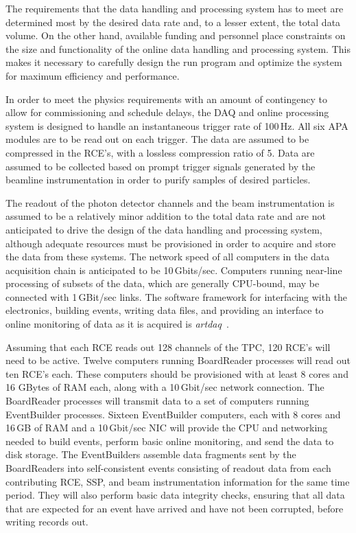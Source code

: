 The requirements that the data handling and processing system has to meet are
determined most  by the desired data rate and, to a lesser extent, the total data volume.
On the other hand, available funding and personnel place
constraints on the size and functionality of the online data handling
and processing system. This makes it necessary to carefully design
the run program and optimize the system for maximum efficiency and
performance.

In order to meet the physics requirements with an amount of
contingency to allow for commissioning and schedule delays, the DAQ
and online processing system is designed to handle an instantaneous
trigger rate of 100\,Hz.  All six APA modules are to be read out on
each trigger.  The data are assumed to be compressed in the RCE's,
with a lossless compression ratio of 5.  Data are assumed to be
collected based on prompt trigger signals generated by the beamline
instrumentation in order to purify samples of desired particles.

The readout of the photon detector channels and the beam
instrumentation is assumed to be a relatively minor addition to the
total data rate and are not anticipated to drive the design of the
data handling and processing system, although adequate resources must
be provisioned in order to acquire and store the data from these
systems.  The network speed of all computers in the data acquisition
chain is anticipated to be 10\,Gbits/sec.  Computers running near-line
processing of subsets of the data, which are generally CPU-bound, may
be connected with 1\,GBit/sec links.  The software framework for
interfacing with the electronics, building events, writing data files,
and providing an interface to online monitoring of data as it is
acquired is {\it artdaq}~\cite{artdaq}.

Assuming that each RCE reads out 128 channels of the TPC, 120 RCE's
will need to be active.  Twelve computers running BoardReader
processes will read out ten RCE's each.  These computers should be
provisioned with at least 8 cores and 16 GBytes of RAM each, along
with a 10\,Gbit/sec network connection.  The BoardReader processes will
transmit data to a set of computers running EventBuilder processes.
Sixteen EventBuilder computers, each with 8 cores and 16\,GB of RAM
and a 10\,Gbit/sec NIC will provide the CPU and networking needed to
build events, perform basic online monitoring, and send the data to
disk storage.  The EventBuilders assemble data fragments sent by the
BoardReaders into self-consistent events consisting of readout data
from each contributing RCE, SSP, and beam instrumentation information
for the same time period.  They will also perform basic data integrity
checks, ensuring that all data that are expected for an event have
arrived and have not been corrupted, before writing records out.


